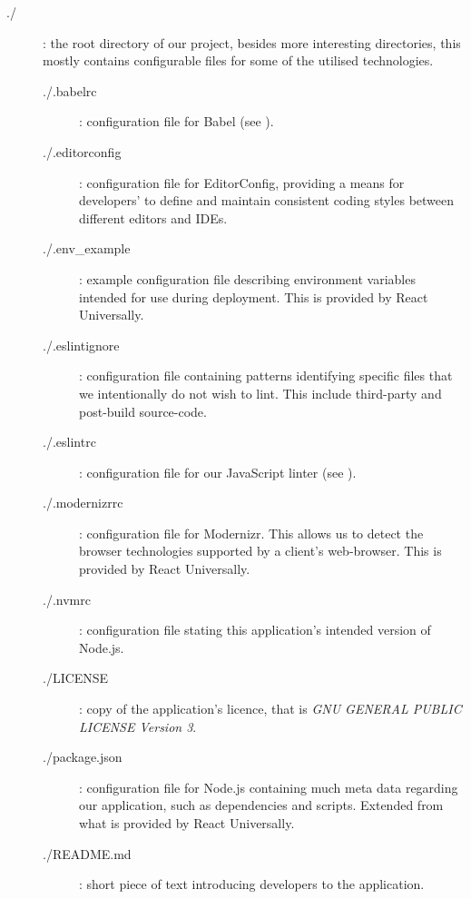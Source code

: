 \documentclass{standalone}
\begin{document}
		\begin{formal}
			\begin{description}
					\item[./]: the root directory of our project, besides more interesting directories, this mostly contains configurable files for some of the utilised technologies.
					\begin{description}
	        	\item[./.babelrc]: configuration file for Babel (see ).

	        	\item[./.editorconfig]: configuration file for EditorConfig, providing a means for developers' to define and maintain consistent coding styles between different editors and IDEs.

	        	\item[./.env\_example]: example configuration file describing environment variables intended for use during deployment. This is provided by React Universally.

	        	\item[./.eslintignore]: configuration file containing patterns identifying specific files that we intentionally do not wish to lint. This include third-party and post-build source-code.

	        	\item[./.eslintrc]: configuration file for our JavaScript linter (see ).

	        	\item[./.modernizrrc]: configuration file for Modernizr. This allows us to detect the browser technologies supported by a client's web-browser. This is provided by React Universally.

	        	\item[./.nvmrc]: configuration file stating this application's intended version of Node.js.

	        	\item[./LICENSE]: copy of the application's licence, that is \emph{GNU GENERAL PUBLIC LICENSE Version 3}.

	        	\item[./package.json]: configuration file for Node.js containing much meta data regarding our application, such as dependencies and scripts. Extended from what is provided by React Universally.

	        	\item[./README.md]: short piece of text introducing developers to the application.


\end{description}
\end{description}
\end{formal}
\end{document}
